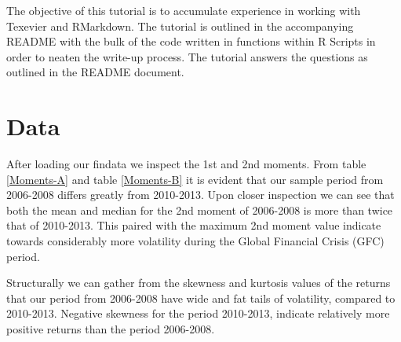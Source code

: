 \documentclass[11pt,preprint, authoryear]{elsarticle}
\numberwithin{equation}{section}
\numberwithin{figure}{section}
\numberwithin{table}{section}
\begin{document}
The objective of this tutorial is to accumulate experience in working
with Texevier and RMarkdown. The tutorial is outlined in the
accompanying README with the bulk of the code written in functions
within R Scripts in order to neaten the write-up process. The tutorial
answers the questions as outlined in the README document.

\section{\texorpdfstring{Data \label{Data}}{Data }}\label{data}

After loading our findata we inspect the 1st and 2nd moments. From table
\ref{Moments-A} and table \ref{Moments-B} it is evident that our sample
period from 2006-2008 differs greatly from 2010-2013. Upon closer
inspection we can see that both the mean and median for the 2nd moment
of 2006-2008 is more than twice that of 2010-2013. This paired with the
maximum 2nd moment value indicate towards considerably more volatility
during the Global Financial Crisis (GFC) period.

Structurally we can gather from the skewness and kurtosis values of the
returns that our period from 2006-2008 have wide and fat tails of
volatility, compared to 2010-2013. Negative skewness for the period
2010-2013, indicate relatively more positive returns than the period
2006-2008.
\end{document}
